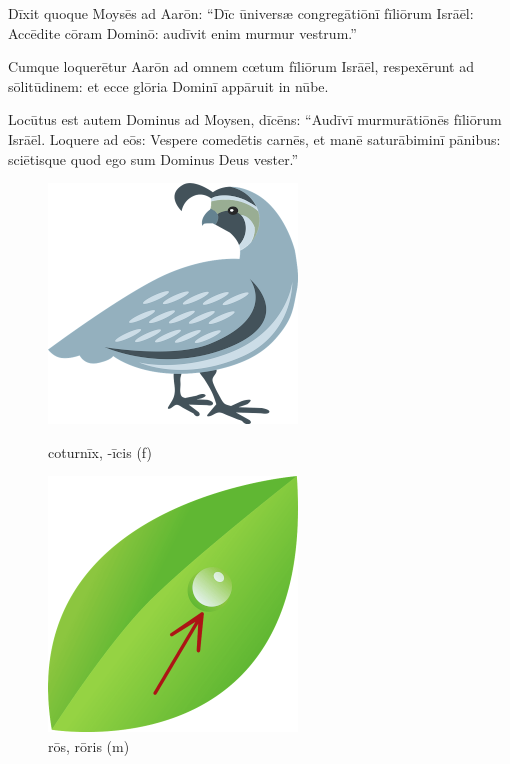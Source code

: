 Dīxit quoque Moysēs ad Aarōn: ``Dīc ūniversæ congregātiōnī
fīliōrum Isrāēl: Accēdite cōram Dominō: audīvit enim murmur vestrum.''

Cumque loquerētur Aarōn ad omnem cœtum fīliōrum Isrāēl, respexērunt ad sōlitūdinem: et ecce glōria Dominī appāruit in nūbe.

Locūtus est autem Dominus ad Moysen, dīcēns: ``Audīvī murmurātiōnēs
fīliōrum Isrāēl. Loquere ad eōs: Vespere comedētis carnēs, et manē
saturābiminī pānibus: sciētisque quod ego sum Dominus Deus
vester.''

\begin{figure}[h!]
    \begin{minipage}[hp]{0.5\linewidth}
        \centering
        \includegraphics{quail}
        \caption{coturnīx, -īcis (f)}
    \end{minipage}%
    \begin{minipage}[hp]{0.5\linewidth}
        \centering
        \includegraphics{dew}
        \caption{rōs, rōris (m)}
    \end{minipage}
\end{figure}

